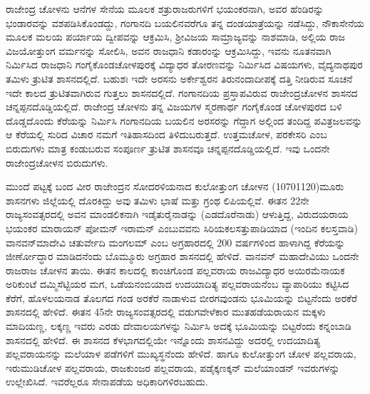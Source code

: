 ರಾಜೇಂದ್ರ ಚೋಳನು ಆನೆಗಳ ಸೇನೆಯ ಮೂಲಕ ಶತ್ರುರಾಜರುಗಳಿಗೆ ಭಯಂಕರನಾಗಿ, ಅವರ ಹೆಂಡಿರನ್ನು ಭಂಡಾರವನ್ನು ವಶಪಡಿಸಿಕೊಂಡದ್ದು, ಗಂಗಾನದಿ ಬಯಲಿನವರೆಗೂ ತನ್ನ ದಂಡಯಾತ್ರೆಯನ್ನು ನಡೆಸಿದ್ದು, ನೌಕಾಸೇನೆಯ ಮೂಲಕ ಮಲಯ ಪರ್ಯಾಯ ದ್ವೀಪವನ್ನು ಆಕ್ರಮಿಸಿ, ಶ‍್ರೀವಿಜಯ ಸಾಮ್ರಾಜ್ಯವನ್ನು ನಾಶಮಾಡಿ, ಅಲ್ಲಿಯ ರಾಜ ವಿಜಯೋತ್ತುಂಗ ವರ್ಮನನ್ನು ಸೋಲಿಸಿ, ಅವನ ರಾಜಧಾನಿ ಕಡಾರಂನ್ನು ಆಕ್ರಮಿಸಿದ್ದು, ಇವನು ನೂತನವಾಗಿ ನಿರ್ಮಿಸಿದ ರಾಜಧಾನಿ ಗಂಗೈಕೊಂಡಚೋಳಪುರಕ್ಕೆ ವಿದ್ಯಾಧರ ತೋರಣವನ್ನು ನಿರ್ಮಿಸಿದ ವಿಷಯಗಳು, ವೈದ್ಯನಾಥಪುರ ತಮಿಳು ತ್ರುಟಿತ ಶಾಸನ\-ದಲ್ಲಿದೆ. ಬಹುಶಃ ಇದೇ ಅರಸನು ಅರ್ಕೇಶ್ವರನ ತಿರುನಂದಾದೀಪಕ್ಕೆ ದತ್ತಿ ನೀಡಿರುವ ಸೂಚನೆ ಇದೇ ಕಾಲದ ತ್ರುಟಿತವಾಗಿರುವ ಗುತ್ತಲು ಶಾಸನದಲ್ಲಿದೆ. ಗಂಗಾನದಿಯ ಪ್ರಸ್ತಾಪವಿರುವ ರಾಜೇಂದ್ರಚೋಳನ ಶಾಸನದ ಚನ್ನಪ್ಪನದೊಡ್ಡಿಯಲ್ಲಿದೆ. ರಾಜೇಂದ್ರ ಚೋಳನು ತನ್ನ ವಿಜಯಗಳ ಸ್ಮರಣಾರ್ಥ ಗಂಗೈಕೊಂಡ ಚೋಳಪುರದ ಬಳಿ ದೊಡ್ಡದೊಂದು ಕೆರೆಯನ್ನು ನಿರ್ಮಿಸಿ ಗಂಗಾನದಿಯ ಬಯಲಿನ ಅರಸರನ್ನು ಗೆದ್ದಾಗ ಅಲ್ಲಿಂದ ತಂದಿದ್ದ ಪವಿತ್ರಜಲವನ್ನು ಆ ಕೆರೆಯಲ್ಲಿ ಸುರಿದ ವಿಚಾರ ನಮಗೆ ಇತಿಹಾಸದಿಂದ ತಿಳಿದುಬರುತ್ತದೆ. ಉತ್ತಮಚೋಳ, ಪರಕೇಸರಿ ಎಂಬ ಬಿರುದುಗಳು ಮಾತ್ರ ಕಂಡುಬರುವ ಸಂಪೂರ್ಣ ತ್ರುಟಿತ ಶಾಸನವೂ ಚನ್ನಪ್ಪನದೊಡ್ಡಿಯಲ್ಲಿದೆ. ಇವು ಒಂದನೇ ರಾಜೇಂದ್ರಚೋಳನ ಬಿರುದುಗಳು.

ಮುಂದೆ ಪಟ್ಟಕ್ಕೆ ಬಂದ ವೀರ ರಾಜೇಂದ್ರನ ಸೋದರಳಿಯನಾದ ಕುಲೋತ್ತುಂಗ ಚೋಳನ (1070\enginline{-}1120)ಮೂರು ಶಾಸನಗಳು ಜಿಲ್ಲೆಯಲ್ಲಿ ದೊರಕಿದ್ದು ಅವು ತಮಿಳು ಭಾಷೆ ಮತ್ತು ಗ್ರಂಥ ಲಿಪಿಯಲ್ಲಿವೆ. ಈತನ 22ನೇ ರಾಜ್ಯಸಂವತ್ಸರದಲ್ಲಿ ಅವನ ಮಾಂಡಲಿಕನಾಗಿ ಇಡೈತುರೈನಾಡನ್ನು (ಎಡದೊರೆನಾಡು) ಆಳುತ್ತಿದ್ದ, ವಿರುದಯರಾಯ ಭಯಂಕರ ಮಾರಾಯನ್​ ಪೋಮನ್​ ಇರಾಮನ್​ ಎಂಬುವವನು ಸಿರಿಯಕಲಸತ್ತುಪಾಡಿಯಾದ (ಇಂದಿನ ಕಲಸ್ತವಾಡಿ) ವಾನವನ್​ಮಾದೇವಿ ಚತುರ್ವೇದಿ ಮಂಗಲಮ್ ಎಂಬ ಅಗ್ರಹಾರದಲ್ಲಿ 200 ವರ್ಷಗಳಿಂದ ಹಾಳಾಗಿದ್ದ ಕೆರೆಯನ್ನು ಜೀರ್ಣೋದ್ಧಾರ ಮಾಡಿದನೆಂದು ಬೊಮ್ಮೂರು ಅಗ್ರಹಾರ ಶಾಸನದಲ್ಲಿ ಹೇಳಿದೆ. ವಾನವನ್​ ಮಹಾದೇವಿಯು ಒಂದನೇ ರಾಜರಾಜ ಚೋಳನ ತಾಯಿ. ಈತನ ಕಾಲದಲ್ಲಿ ಕಾಂಚಿಗೊಂಡ ಪಲ್ಲವರಾಯ ರಾಜವಿದ್ಯಾಧರ ಅಯಿರಮೆನಾಯಕ ಅರಿಕುಂಟೆ ದಮ್ಮಿಸೆಟ್ಟಿಯರ ಮಗ, ಒಡೆಯನಂಬಿಯಾದ ಉದಯಾದಿತ್ಯ ಪಲ್ಲವರಾಯನೆಂಬ ವ್ಯಾಪಾರಿಯು ಕಟ್ಟಿಸಿದ ಕೆರೆಗೆ, ಹೊಳಲಯನಾಡ ತೊಲಗದ ಗಂಡ ಅರಕೆರೆ ನಾಡಾಳುವ ಬೀರಗವುಂಡನು ಭೂಮಿಯನ್ನು ಬಿಟ್ಟನೆಂದು ಅರಕೆರೆ ಶಾಸನದಲ್ಲಿ ಹೇಳಿದೆ. ಈತನ 45ನೇ ರಾಜ್ಯಸಂವತ್ಸರದಲ್ಲಿ ವಡುಗವೇಳೆಕಾರ ಮುತಹಡೆಯರಾಯನ ಮಕ್ಕಳು ಮಾದಿಯಣ್ಣ, ಲಕ್ಕಣ್ಣ ಇವರು ಎರಡು ದೇವಾಲಯಗಳನ್ನು ನಿರ್ಮಿಸಿ ಅದಕ್ಕೆ ಭೂಮಿಯನ್ನು ಬಿಟ್ಟರೆಂದು ಕನ್ನಂಬಾಡಿ ಶಾಸನದಲ್ಲಿ ಹೇಳಿದೆ. ಈ ಶಾಸನದ ಕೆಳಭಾಗದಲ್ಲಿಯೇ ಇನ್ನೊಂದು ಶಾಸನವಿದ್ದು ಅದರಲ್ಲಿ ಉದಯಾದಿತ್ಯ ಪಲ್ಲವರಾಯನನ್ನು ಮಲೆಯಾಳ ಪಡೆಗಳಿಗೆ ಮುಖ್ಯಸ್ಥನೆಂದು ಹೇಳಿದೆ. ಹಾಗೂ ಕುಲೋತ್ತುಂಗ ಚೋಳ ಪಲ್ಲವರಾಯ, ಇರುಮುಡಿಚೋಳ ಪಲ್ಲವರಾಯ, ರಾಜಕುಂಜರ ಪಲ್ಲವರಾಯ, ಪಡೈಕ್ಕಣಕ್ಕನ್​ ಮಲೆಯಾಂಡನ್​ ಇವರುಗಳನ್ನು ಉಲ್ಲೇಖಿಸಿದೆ. ಇವರೆಲ್ಲರೂ ಸೇನಾಪಡೆಯ ಅಧಿಕಾರಿಗಳಿರಬಹುದು.



